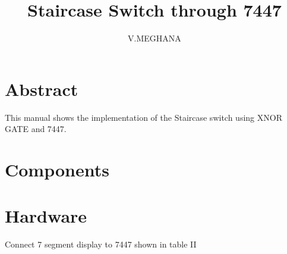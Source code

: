 \documentclass[journal,12pt,twocolumn]{IEEEtran}
\begin{document}
%

\theoremstyle{definition}
\newtheorem{theorem}{Theorem}[section]
\newtheorem{problem}{Problem}
\newtheorem{proposition}{Proposition}[section]
\newtheorem{lemma}{Lemma}[section]
\newtheorem{corollary}[theorem]{Corollary}
\newtheorem{example}{Example}[section]
\newtheorem{definition}{Definition}[section]
\newcommand{\BEQA}{\begin{eqnarray}}
\newcommand{\EEQA}{\end{eqnarray}}
\newcommand{\define}{\stackrel{\triangle}{=}}
\vspace{3cm}
\title{ 
Staircase Switch through 7447
}

\author{V.MEGHANA}


\maketitle
\tableofcontents
\bigskip
%
\section{Abstract}

This manual shows the implementation of the Staircase switch using XNOR GATE and 7447.
\section{\textbf{Components}}

\section{Hardware}

\begin{table}[!h]
\centering
%

\caption{}
\label{table:7447_disp}
\end{table}
Connect 7 segment display to 7447 shown in table II
\begin{table}[ht]
\centering
{}
\caption{}
\label{tab:first table}
\end{table}
\end{document}
